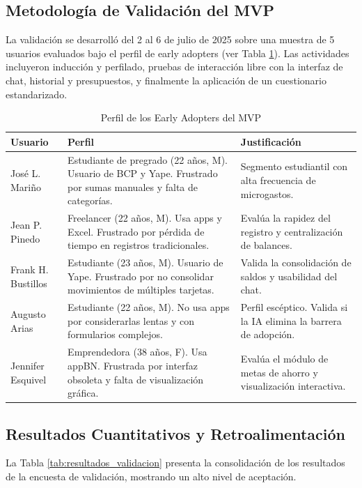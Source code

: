 \documentclass[12pt]{article}
\begin{document}
\subsection{Metodología de Validación del MVP}
La validación se desarrolló del 2 al 6 de julio de 2025 sobre una muestra de 5 usuarios evaluados bajo el perfil de early adopters (ver Tabla \ref{tab:early_adopters}). Las actividades incluyeron inducción y perfilado, pruebas de interacción libre con la interfaz de chat, historial y presupuestos, y finalmente la aplicación de un cuestionario estandarizado.

\begin{table}[H]
\centering
\singlespacing
\caption{Perfil de los Early Adopters del MVP}
\label{tab:early_adopters}
\begin{tabular}{p{3.5cm}p{5.7cm}p{6cm}}
\toprule
\textbf{Usuario} & \textbf{Perfil} & \textbf{Justificación} \\
\midrule
José L. Mariño & Estudiante de pregrado (22 años, M). Usuario de BCP y Yape. Frustrado por sumas manuales y falta de categorías. & Segmento estudiantil con alta frecuencia de microgastos. \\
Jean P. Pinedo & Freelancer (22 años, M). Usa apps y Excel. Frustrado por pérdida de tiempo en registros tradicionales. & Evalúa la rapidez del registro y centralización de balances. \\
Frank H. Bustillos & Estudiante (23 años, M). Usuario de Yape. Frustrado por no consolidar movimientos de múltiples tarjetas. & Valida la consolidación de saldos y usabilidad del chat. \\
Augusto Arias & Estudiante (22 años, M). No usa apps por considerarlas lentas y con formularios complejos. & Perfil escéptico. Valida si la IA elimina la barrera de adopción. \\
Jennifer Esquivel & Emprendedora (38 años, F). Usa appBN. Frustrada por interfaz obsoleta y falta de visualización gráfica. & Evalúa el módulo de metas de ahorro y visualización interactiva. \\
\bottomrule
\end{tabular}
\end{table}

\subsection{Resultados Cuantitativos y Retroalimentación}
La Tabla \ref{tab:resultados_validacion} presenta la consolidación de los resultados de la encuesta de validación, mostrando un alto nivel de aceptación.
\end{document}
